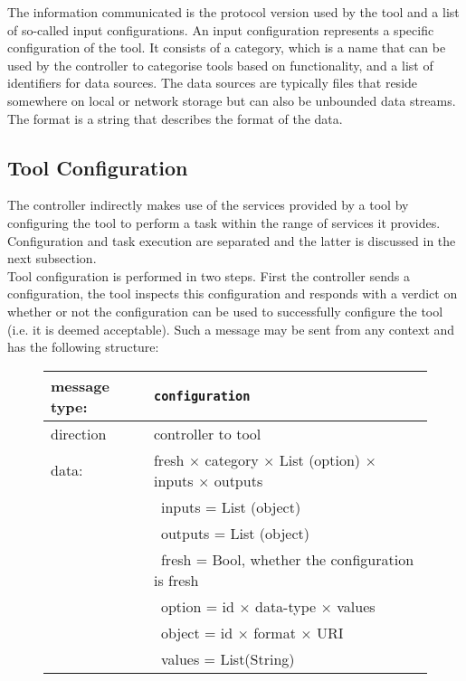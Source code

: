 \documentclass{article}
\newcommand{\msg}[1]{\texttt{#1}}
\begin{document}
   The information communicated is the protocol version used by the tool and a
   list of so-called input configurations. An input configuration represents a
   specific configuration of the tool. It consists of a category, which is a
   name that can be used by the controller to categorise tools based on
   functionality, and a list of identifiers for data sources. The data sources
   are typically files that reside somewhere on local or network storage but
   can also be unbounded data streams. The format is a string that describes
   the format of the data.

  \subsection{Tool Configuration}

   The controller indirectly makes use of the services provided by a tool by
   configuring the tool to perform a task within the range of services it
   provides. Configuration and task execution are separated and the latter is
   discussed in the next subsection.
   \\[4pt]
   Tool configuration is performed in two steps. First the controller sends a
   configuration, the tool inspects this configuration and responds with a
   verdict on whether or not the configuration can be used to successfully
   configure the tool (i.e. it is deemed acceptable). Such a message may be
   sent from any context and has the following structure:
   
   \begin{figure}[H]
    \begin{tabular}{|ll|}
     \hline
      message type:   & \msg{configuration} \\
     \hline
      direction       & controller to tool \\
      data:           & fresh $\times$ category $\times$ List (option) $\times$ inputs $\times$ outputs \\
                      & \ inputs  = List (object) \\
                      & \ outputs = List (object) \\
                      & \ fresh   = Bool, whether the configuration is fresh \\
                      & \ option  = id $\times$ data-type $\times$ values \\
                      & \ object  = id $\times$ format $\times$ URI \\
                      & \ values  = List(String) \\
     \hline
    \end{tabular}
   \end{figure}
\end{document}
